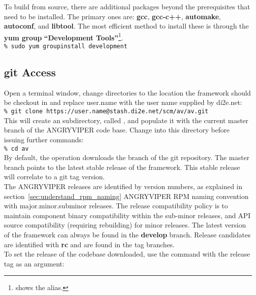 \begin{appendices}
To build from source, there are additional packages beyond the prerequisites that need to be installed. The primary ones are: \textbf{gcc}, \textbf{gcc-c++}, \textbf{automake}, \textbf{autoconf}, and \textbf{libtool}.  The most efficient method to install these is through the \textbf{yum group} \textbf{``Development Tools''}\footnote{ shows the  alias.}.\\

\verb+% sudo yum groupinstall development+
\iffalse
\subsection{git Access}
Open a terminal window, change directories to the location the framework should be checkout in and replace user.name with the user name supplied by di2e.net:\\

\verb+% git clone https://user.name@stash.di2e.net/scm/av/av.git+\\

This will create an  subdirectory, called , and populate it with the current master branch of the ANGRYVIPER code base. Change into this directory before issuing further commands:\\

\verb+% cd av+\\

By default, the  operation downloads the  branch of the git repository. The master branch points to the latest stable release of the framework. This stable release will correlate to a git tag version.\\

The ANGRYVIPER releases are identified by version numbers, as explained in section~\ref{sec:understand_rpm_naming} ANGRYVIPER RPM naming convention with major.minor.subminor releases. The release compatibility policy is to maintain component binary compatibility within the sub-minor releases, and API source compatibility (requiring rebuilding) for minor releases. The latest version of the framework can always be found in the \textbf{develop} branch. Release candidates are identified with \textbf{rc} and are found in the tag branches.\\

To set the release of the codebase downloaded, use the  command with the release tag as an argument:\\


\end{appendices}
